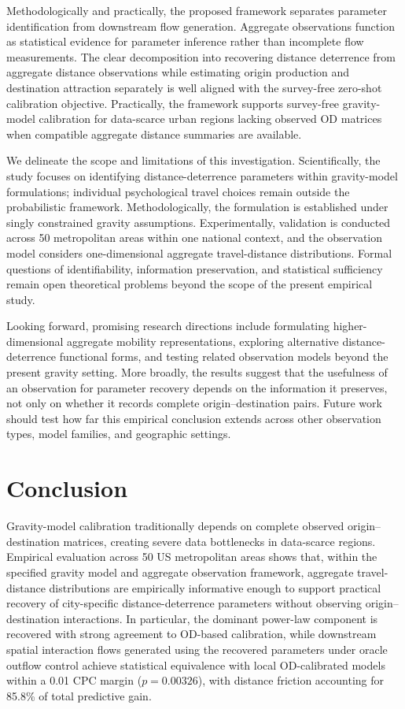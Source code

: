 \documentclass[pdflatex,sn-basic,iicol]{sn-jnl}
\begin{document}
Methodologically and practically, the proposed framework separates parameter identification from downstream flow generation. Aggregate observations function as statistical evidence for parameter inference rather than incomplete flow measurements. The clear decomposition into recovering distance deterrence from aggregate distance observations while estimating origin production and destination attraction separately is well aligned with the survey-free zero-shot calibration objective. Practically, the framework supports survey-free gravity-model calibration for data-scarce urban regions lacking observed OD matrices when compatible aggregate distance summaries are available.

We delineate the scope and limitations of this investigation. Scientifically, the study focuses on identifying distance-deterrence parameters within gravity-model formulations; individual psychological travel choices remain outside the probabilistic framework. Methodologically, the formulation is established under singly constrained gravity assumptions. Experimentally, validation is conducted across 50 metropolitan areas within one national context, and the observation model considers one-dimensional aggregate travel-distance distributions. Formal questions of identifiability, information preservation, and statistical sufficiency remain open theoretical problems beyond the scope of the present empirical study.

Looking forward, promising research directions include formulating higher-dimensional aggregate mobility representations, exploring alternative distance-deterrence functional forms, and testing related observation models beyond the present gravity setting. More broadly, the results suggest that the usefulness of an observation for parameter recovery depends on the information it preserves, not only on whether it records complete origin--destination pairs. Future work should test how far this empirical conclusion extends across other observation types, model families, and geographic settings.

\section{Conclusion}\label{sec:conclusion}

Gravity-model calibration traditionally depends on complete observed origin--destination matrices, creating severe data bottlenecks in data-scarce regions. Empirical evaluation across 50 US metropolitan areas shows that, within the specified gravity model and aggregate observation framework, aggregate travel-distance distributions are empirically informative enough to support practical recovery of city-specific distance-deterrence parameters without observing origin--destination interactions. In particular, the dominant power-law component is recovered with strong agreement to OD-based calibration, while downstream spatial interaction flows generated using the recovered parameters under oracle outflow control achieve statistical equivalence with local OD-calibrated models within a 0.01 CPC margin ($p = 0.00326$), with distance friction accounting for 85.8\% of total predictive gain.
\end{document}
